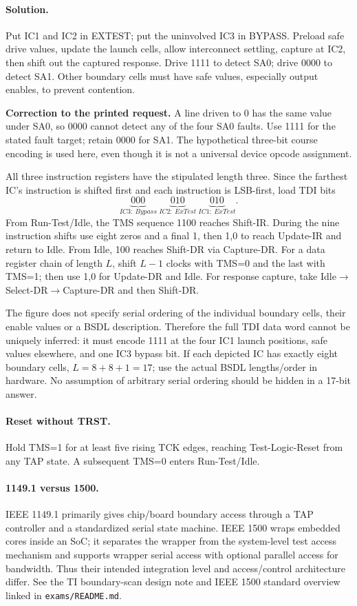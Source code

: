 \documentclass[11pt]{article}
\newcommand{\sol}{\paragraph{Solution.}}
\begin{document}
\sol Put IC1 and IC2 in EXTEST; put the uninvolved IC3 in BYPASS.
Preload safe drive values, update the launch cells, allow interconnect settling,
capture at IC2, then shift out the captured response. Drive 1111 to detect SA0;
drive 0000 to detect SA1. Other boundary cells must have safe values, especially
output enables, to prevent contention.

\textbf{Correction to the printed request.} A line driven to 0 has the same
value under SA0, so 0000 cannot detect any of the four SA0 faults.
Use 1111 for the stated fault target; retain 0000 for SA1.
The hypothetical three-bit course encoding is used here, even though it is not
a universal device opcode assignment.

All three instruction registers have the stipulated length three.
Since the farthest IC's instruction is shifted first and each instruction is
LSB-first, load TDI bits
\[
\underbrace{000}_{IC3:\ Bypass}
\ \underbrace{010}_{IC2:\ ExTest}
\ \underbrace{010}_{IC1:\ ExTest}.
\]
From Run-Test/Idle, the TMS sequence 1100 reaches Shift-IR.
During the nine instruction shifts use eight zeros and a final 1, then 1,0
to reach Update-IR and return to Idle.
From Idle, 100 reaches Shift-DR via Capture-DR.
For a data register chain of length $L$, shift $L-1$ clocks with TMS=0 and the
last with TMS=1; then use 1,0 for Update-DR and Idle.
For response capture, take Idle$\to$Select-DR$\to$Capture-DR and then Shift-DR.

The figure does not specify serial ordering of the individual boundary cells,
their enable values or a BSDL description. Therefore the full TDI data word
cannot be uniquely inferred: it must encode 1111 at the four IC1 launch positions,
safe values elsewhere, and one IC3 bypass bit. If each depicted IC has exactly
eight boundary cells, $L=8+8+1=17$; use the actual BSDL lengths/order in hardware.
No assumption of arbitrary serial ordering should be hidden in a 17-bit answer.

\paragraph{Reset without TRST.}
Hold TMS=1 for at least five rising TCK edges, reaching Test-Logic-Reset
from any TAP state. A subsequent TMS=0 enters Run-Test/Idle.

\paragraph{1149.1 versus 1500.}
IEEE 1149.1 primarily gives chip/board boundary access through a TAP controller
and a standardized serial state machine. IEEE 1500 wraps embedded cores inside
an SoC; it separates the wrapper from the system-level test access mechanism
and supports wrapper serial access with optional parallel access for bandwidth.
Thus their intended integration level and access/control architecture differ.
See the TI boundary-scan design note and IEEE 1500 standard overview linked in
\texttt{exams/README.md}.
\end{document}

